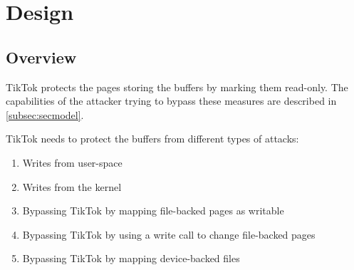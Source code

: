 \section{Design}
\label{sec:design}

\subsection{Overview}
\label{subsec:designoverview}
TikTok protects the pages storing the buffers by marking them
read-only. The capabilities of the attacker trying to bypass these measures
are described in \cref{subsec:secmodel}.

TikTok needs to protect the buffers from different types of attacks:
\begin{enumerate}
  \item \label{first} Writes from user-space
  \item \label{second} Writes from the kernel
  \item \label{third} Bypassing TikTok by mapping file-backed pages as writable
  \item \label{fourth} Bypassing TikTok by using a write call to change file-backed pages
  \item \label{fifth} Bypassing TikTok by mapping device-backed files
\end{enumerate}

